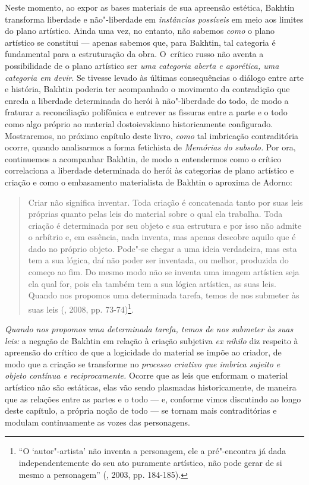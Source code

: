 Neste momento, ao expor as bases materiais de sua apreensão estética,
Bakhtin transforma liberdade e não"-liberdade em \emph{instâncias
possíveis} em meio aos limites do plano artístico. Ainda uma vez, no
entanto, não sabemos \emph{como} o plano artístico se constitui ---
apenas sabemos que, para Bakhtin, tal categoria é fundamental para a
estruturação da obra. O~crítico russo não aventa a possibilidade de o
plano artístico ser \emph{uma categoria aberta e aporética, uma
categoria em devir}. Se tivesse levado às últimas consequências o
diálogo entre arte e história, Bakhtin poderia ter acompanhado o
movimento da contradição que enreda a liberdade determinada do herói à
não"-liberdade do todo, de modo a fraturar a reconciliação polifônica e
entrever as fissuras entre a parte e o todo como algo próprio ao
material dostoievskiano historicamente configurado. Mostraremos, no
próximo capítulo deste livro, \emph{como} tal imbricação contraditória
ocorre, quando analisarmos a forma fetichista de \emph{Memórias do
subsolo.} Por ora, continuemos a acompanhar Bakhtin, de modo a
entendermos como o crítico correlaciona a liberdade determinada do herói
às categorias de plano artístico e criação e como o embasamento
materialista de Bakhtin o aproxima de Adorno:

\begin{quote}
Criar não significa inventar. Toda criação é concatenada tanto por suas
leis próprias quanto pelas leis do material sobre o qual ela trabalha.
Toda criação é determinada por seu objeto e sua estrutura e por isso não
admite o arbítrio e, em essência, nada inventa, mas apenas descobre
aquilo que é dado no próprio objeto. Pode"-se chegar a uma ideia
verdadeira, mas esta tem a sua lógica, daí não poder ser inventada, ou
melhor, produzida do começo ao fim. Do mesmo modo não se inventa uma
imagem artística seja ela qual for, pois ela também tem a sua lógica
artística, as suas leis. Quando nos propomos uma determinada tarefa,
temos de nos submeter às suas leis (, 2008, pp. 73-74)\footnote{``O
  `autor"-artista' não inventa a personagem, ele a pré"-encontra já dada
  independentemente do seu ato puramente artístico, não pode gerar de si
  mesmo a personagem'' (, 2003, pp. 184-185).}.
\end{quote}

\emph{Quando nos propomos uma determinada tarefa, temos de nos submeter
às suas leis:} a negação de Bakhtin em relação à criação subjetiva
\emph{ex nihilo} diz respeito à apreensão do crítico de que a logicidade
do material se impõe ao criador, de modo que a criação se transforme no
\emph{processo criativo que imbrica sujeito e objeto contínua e
reciprocamente.} Ocorre que as leis que enformam o material artístico
não são estáticas, elas vão sendo plasmadas historicamente, de maneira
que as relações entre as partes e o todo --- e, conforme vimos discutindo
ao longo deste capítulo, a própria noção de todo --- se tornam mais
contraditórias e modulam continuamente as vozes das personagens.

